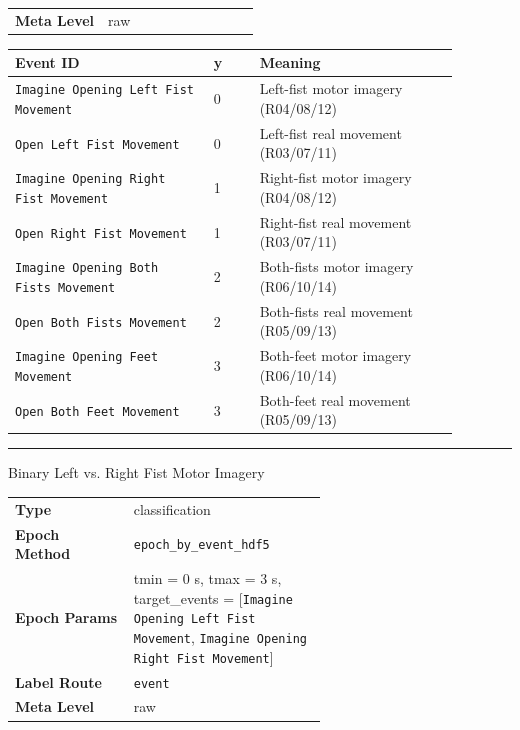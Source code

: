 {\begin{tcolorbox}
{\begin{tabular}{@{}lp{0.62\linewidth}@{}}
\textbf{Meta Level} & raw \\
\end{tabular}}
\par{}\par\smallskip
\begingroup\footnotesize
\begin{tabular}{@{}p{0.3911\linewidth}p{0.0978\linewidth}p{0.3911\linewidth}@{}}
\toprule
\textbf{Event ID} & \textbf{y} & \textbf{Meaning} \\
\midrule
\texttt{Imagine Opening Left Fist Movement} & 0 & Left-fist motor imagery (R04/08/12) \\
\texttt{Open Left Fist Movement} & 0 & Left-fist real movement (R03/07/11) \\
\texttt{Imagine Opening Right Fist Movement} & 1 & Right-fist motor imagery (R04/08/12) \\
\texttt{Open Right Fist Movement} & 1 & Right-fist real movement (R03/07/11) \\
\texttt{Imagine Opening Both Fists Movement} & 2 & Both-fists motor imagery (R06/10/14) \\
\texttt{Open Both Fists Movement} & 2 & Both-fists real movement (R05/09/13) \\
\texttt{Imagine Opening Feet Movement} & 3 & Both-feet motor imagery (R06/10/14) \\
\texttt{Open Both Feet Movement} & 3 & Both-feet real movement (R05/09/13) \\
\bottomrule
\end{tabular}
\endgroup
\noindent\rule{\linewidth}{0.4pt}\par\nopagebreak
{} {\footnotesize Binary Left vs. Right Fist Motor Imagery}\par\smallskip
{\footnotesize\begin{tabular}{@{}lp{0.62\linewidth}@{}}
\textbf{Type} & classification \\
\textbf{Epoch Method} & \texttt{epoch\_by\_event\_hdf5} \\
\textbf{Epoch Params} & tmin = 0 s, tmax = 3 s, target\_events = [\texttt{Imagine Opening Left Fist Movement}, \texttt{Imagine Opening Right Fist Movement}] \\
\textbf{Label Route} & \texttt{event} \\
\textbf{Meta Level} & raw \\
\end{tabular}}
\par{}\par\smallskip

\end{tcolorbox}}
